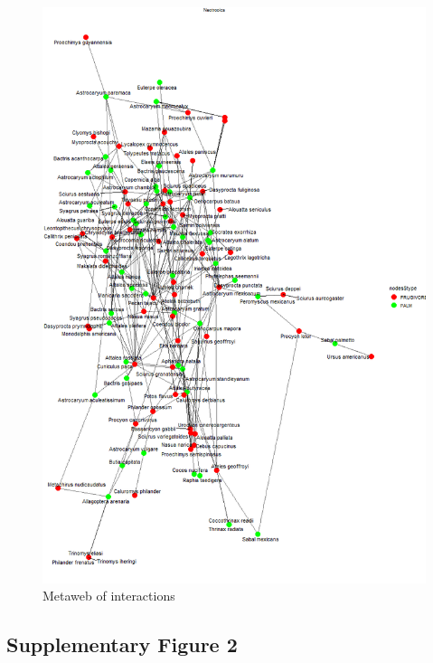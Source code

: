 \documentclass[
]{agujournal2019}
\begin{document}
\begin{figure}[H]

{\centering \includegraphics[width=5.64583in,height=\textheight]{sup_figures/S1_metaweb.png}

}

\caption{Metaweb of interactions}

\end{figure}%

\subsection{Supplementary Figure 2}
\end{document}
